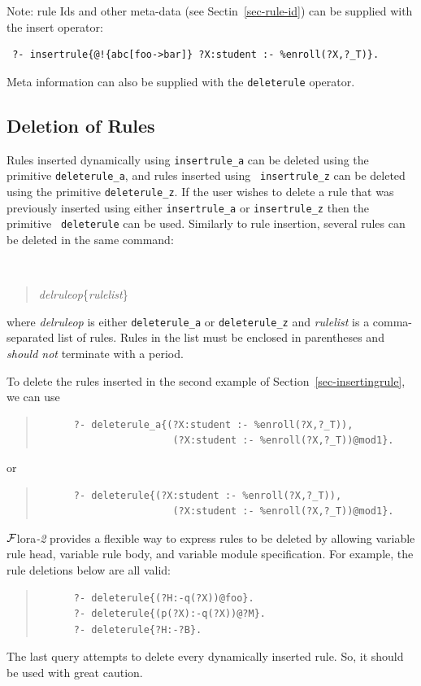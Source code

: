 \documentclass[11pt]{article}
\newcommand{\FLSYSTEM}{{\mbox{\sc ${\cal F}${lora}\rm\emph{-2}}}\xspace}
\begin{document}
Note: rule Ids and other meta-data (see Sectin~\ref{sec-rule-id})
can be supplied with the insert operator: 
\begin{verbatim}
 ?- insertrule{@!{abc[foo->bar]} ?X:student :- %enroll(?X,?_T)}.
\end{verbatim}
Meta information can also be supplied with the \texttt{deleterule}
operator. 


\subsection{Deletion of Rules}
\label{sec-deletingrule}

Rules inserted dynamically using {\tt insertrule\_a} can be deleted using
the primitive {\tt deleterule\_a}, and rules inserted using {\tt
  insertrule\_z} can be deleted using the primitive {\tt deleterule\_z}. If
the user wishes to delete a rule that was previously inserted using either
{\tt insertrule\_a} or {\tt insertrule\_z} then the primitive {\tt
  deleterule} can be used. Similarly to rule insertion, several rules can be
deleted in the same command:
{\tt
\begin{quote}
\emph{delruleop}\{\emph{rulelist}\}
\end{quote}
}
\noindent
where \emph{delruleop} is either {\tt deleterule\_a} or {\tt deleterule\_z}
and \emph{rulelist} is a comma-separated list of rules. Rules in the list
must be enclosed in parentheses and \emph{should not} terminate with a
period.

To delete the rules inserted in the second example of
Section~\ref{sec-insertingrule}, we can use
\begin{quote}
\begin{verbatim}
      ?- deleterule_a{(?X:student :- %enroll(?X,?_T)),
                       (?X:student :- %enroll(?X,?_T))@mod1}.
\end{verbatim}
\end{quote}
or
\begin{quote}
\begin{verbatim}
      ?- deleterule{(?X:student :- %enroll(?X,?_T)),
                       (?X:student :- %enroll(?X,?_T))@mod1}.
\end{verbatim}
\end{quote}

\FLSYSTEM provides a flexible way to express rules to be deleted by
allowing variable rule head, variable rule body, and variable module
specification. For example, the rule deletions below are all valid:
\begin{quote}
\begin{verbatim}
      ?- deleterule{(?H:-q(?X))@foo}.
      ?- deleterule{(p(?X):-q(?X))@?M}.
      ?- deleterule{?H:-?B}.
\end{verbatim}
\end{quote}
The last query attempts to delete every dynamically inserted rule. So, it
should be used with great caution.
\end{document}
